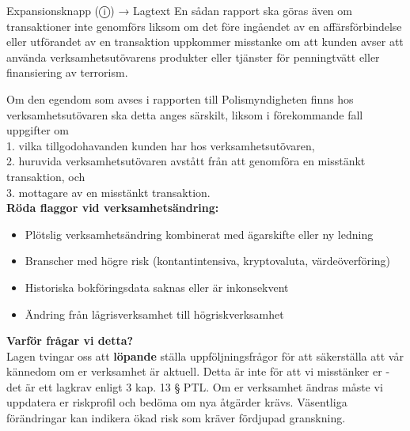 \documentclass[10pt]{beamer}
\begin{document}
\begin{frame}[label=riskfragor-steg1]
\begin{alertblock}{Expansionsknapp (ⓘ) → Lagtext}
    \tiny En sådan rapport ska göras även om transaktioner inte genomförs liksom om det före
     ingåendet av en affärsförbindelse eller utförandet av en transaktion uppkommer misstanke om 
     att kunden avser att använda verksamhetsutövarens produkter eller tjänster för penningtvätt 
     eller finansiering av terrorism.

    \tiny Om den egendom som avses i rapporten till Polismyndigheten finns hos verksamhetsutövaren
     ska detta anges särskilt, liksom i förekommande fall uppgifter om\\
    \tiny 1. vilka tillgodohavanden kunden har hos verksamhetsutövaren,\\
    \tiny 2. huruvida verksamhetsutövaren avstått från att genomföra en misstänkt transaktion, och\\
    \tiny 3. mottagare av en misstänkt transaktion.\\[0.1cm]

    
    
    \tiny \textbf{Röda flaggor vid verksamhetsändring:}\\
    \begin{itemize}
      \item Plötslig verksamhetsändring kombinerat med ägarskifte eller ny ledning
      \item Branscher med högre risk (kontantintensiva, kryptovaluta, värdeöverföring)
      \item Historiska bokföringsdata saknas eller är inkonsekvent
      \item Ändring från lågrisverksamhet till högriskverksamhet
    \end{itemize}
    \vspace{0.1cm}
    
    \tiny \textbf{Varför frågar vi detta?}\\
    \tiny Lagen tvingar oss att \textbf{löpande} ställa uppföljningsfrågor för att säkerställa att vår
     kännedom om er verksamhet är aktuell. Detta är inte för att vi misstänker er - det är ett
    lagkrav enligt 3 kap. 13 § PTL. Om er verksamhet ändras måste vi uppdatera er riskprofil 
    och bedöma om nya åtgärder krävs. Väsentliga förändringar kan indikera ökad risk som kräver 
    fördjupad granskning.
  \end{alertblock}

  \vspace{0.2cm}


\end{frame}
\end{document}
